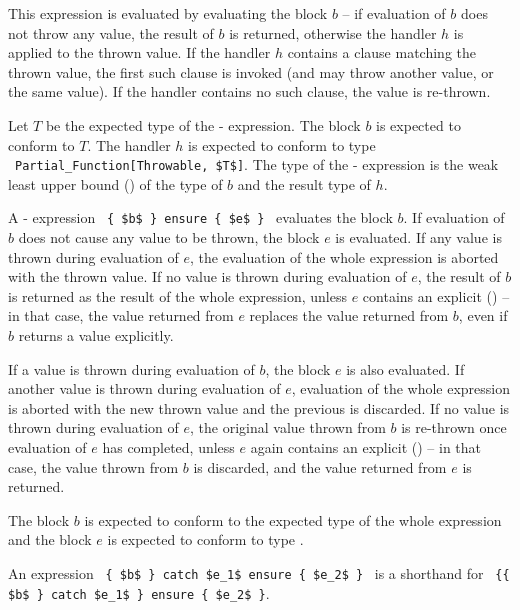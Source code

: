 This expression is evaluated by evaluating the block $b$ -- if evaluation of $b$ does not throw any value, the result of $b$ is returned, otherwise the handler $h$ is applied to the thrown value. If the handler $h$ contains a  clause matching the thrown value, the first such clause is invoked (and may throw another value, or the same value). If the handler contains no such clause, the value is re-thrown. 

Let $T$ be the expected type of the - expression. The block $b$ is expected to conform to $T$. The handler $h$ is expected to conform to type ~\lstinline!Partial_Function[Throwable, $T$]!. The type of the - expression is the weak least upper bound () of the type of $b$ and the result type of $h$. 

A - expression ~\lstinline!{ $b$ } ensure { $e$ }!~ evaluates the block $b$. If evaluation of $b$ does not cause any value to be thrown, the block $e$ is evaluated. If any value is thrown during evaluation of $e$, the evaluation of the whole expression is aborted with the thrown value. If no value is thrown during evaluation of $e$, the result of $b$ is returned as the result of the whole expression, unless $e$ contains an explicit  () -- in that case, the value returned from $e$ replaces the value returned from $b$, even if $b$ returns a value explicitly. 

If a value is thrown during evaluation of $b$, the  block $e$ is also evaluated. If another value is thrown during evaluation of $e$, evaluation of the whole expression is aborted with the new thrown value and the previous is discarded. If no value is thrown during evaluation of $e$, the original value thrown from $b$ is re-thrown once evaluation of $e$ has completed, unless $e$ again contains an explicit  () -- in that case, the value thrown from $b$ is discarded, and the value returned from $e$ is returned. 


The block $b$ is expected to conform to the expected type of the whole expression and the  block $e$ is expected to conform to type . 

An expression ~\lstinline!{ $b$ } catch $e_1$ ensure { $e_2$ }!~ is a shorthand for ~\lstinline!{{ $b$ } catch $e_1$ } ensure { $e_2$ }!. 






